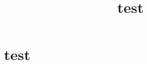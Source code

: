 \documentclass[dvipdfmx,uplatex]{jsarticle}
\author{}
\title{test}
\date{}
\begin{document}
 \maketitle 
    \section{test}
\end{document}
